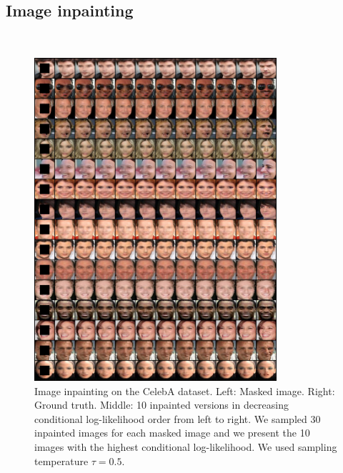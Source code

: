 \subsection{Image inpainting}\ 
\begin{figure}[h!]
    \centering
    \includegraphics[width=0.8\textwidth]{Chapter1/paper_graphs/SupplementaryMaterial/inpainting_celebA_T_0.5_0.png}
    \caption{Image inpainting on the CelebA dataset. Left: Masked image. Right: Ground truth. Middle: 10 inpainted versions in decreasing conditional log-likelihood order from left to right. We sampled 30 inpainted images for each masked image and we present the 10 images with the highest conditional log-likelihood. We used sampling temperature $\tau=0.5$.}
\end{figure}


